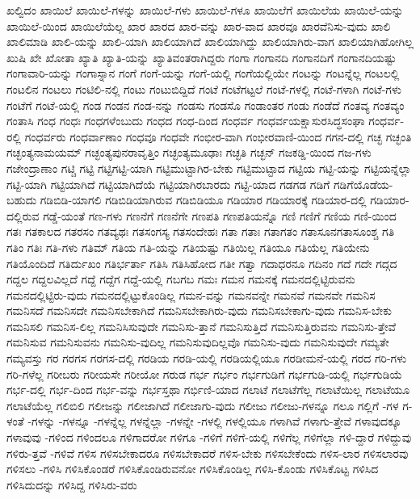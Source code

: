 {ಖಲ್ವಿದಂ
ಖಾಯಿಲೆ
ಖಾಯಿಲೆ-ಗಳನ್ನು
ಖಾಯಿಲೆ-ಗಳು
ಖಾಯಿಲೆ-ಗಳೂ
ಖಾಯಿಲೆಗೆ
ಖಾಯಿಲೆಯ
ಖಾಯಿಲೆ-ಯನ್ನು
ಖಾಯಿಲೆ-ಯಿಂದ
ಖಾಯಿಲೆಯೆಲ್ಲ
ಖಾರ
ಖಾರದ
ಖಾರ-ವನ್ನು
ಖಾರ-ವಾದ
ಖಾರವೂ
ಖಾರವೆನಿಸು-ವುದು
ಖಾಲಿ
ಖಾಲಿಮಾಡಿ
ಖಾಲಿ-ಯನ್ನು
ಖಾಲಿ-ಯಾಗಿ
ಖಾಲಿಯಾಗಿದೆ
ಖಾಲಿಯಾಗಿದ್ದು
ಖಾಲಿಯಾಗಿರು-ವಾಗ
ಖಾಲಿಯಾಗಿಹೋಗಿಲ್ಲ
ಖುಷಿ
ಖೇ
ಖೋತಾ
ಖ್ಯಾತಿ
ಖ್ಯಾತಿ-ಯನ್ನು
ಖ್ಯಾತಿವಂತರಾಗಿದ್ದರು
ಗಂಗಾ
ಗಂಗಾನದಿ
ಗಂಗಾನದಿಗೆ
ಗಂಗಾನದಿಯಷ್ಟು
ಗಂಗಾವಾರಿ-ಯನ್ನು
ಗಂಗಾಸ್ನಾನ
ಗಂಗೆ
ಗಂಗೆ-ಯನ್ನು
ಗಂಗೆ-ಯಲ್ಲಿ
ಗಂಗೆಯಲ್ಲಿಯೇ
ಗಂಟನ್ನು
ಗಂಟನ್ನೆಲ್ಲ
ಗಂಟಲಲ್ಲಿ
ಗಂಟಲಿನ
ಗಂಟಲು
ಗಂಟಿಲಿ-ನಲ್ಲಿ
ಗಂಟು
ಗಂಟುಬಿದ್ದಿದೆ
ಗಂಟೆ
ಗಂಟೆಗಟ್ಟಲೆ
ಗಂಟೆ-ಗಳಲ್ಲಿ
ಗಂಟೆ-ಗಳಾಗಿ
ಗಂಟೆ-ಗಳು
ಗಂಟೆಗೆ
ಗಂಟೆ-ಯಲ್ಲಿ
ಗಂಡ
ಗಂಡನ
ಗಂಡ-ನನ್ನು
ಗಂಡಸು
ಗಂಡಸೊ
ಗಂಡಾಂತರ
ಗಂಡು
ಗಂಡೆದೆ
ಗಂತವ್ಯ
ಗಂತವ್ಯಂ
ಗಂತಾಸಿ
ಗಂಧ
ಗಂಧಃ
ಗಂಧಗಳೆಂಬುದು
ಗಂಧದ
ಗಂಧ-ದಿಂದ
ಗಂಧರ್ವ
ಗಂಧರ್ವಯಕ್ಷಾಸುರಸಿದ್ಧಸಂಘಾ
ಗಂಧರ್ವ-ರಲ್ಲಿ
ಗಂಧರ್ವರು
ಗಂಧರ್ವಾಣಾಂ
ಗಂಧವೂ
ಗಂಧವೇ
ಗಂಭೀರ-ವಾಗಿ
ಗಂಭೀರವಾಣಿ-ಯಿಂದ
ಗಗನ-ದಲ್ಲಿ
ಗಚ್ಛ
ಗಚ್ಛಂತಿ
ಗಚ್ಛಂತ್ಯನಾಮಯಮ್
ಗಚ್ಛಂತ್ಯಪುನರಾವೃತ್ತಿಂ
ಗಚ್ಛಂತ್ಯಮೂಢಾಃ
ಗಚ್ಛತಿ
ಗಚ್ಛನ್
ಗಜಕಡ್ಡಿ-ಯಿಂದ
ಗಜ-ಗಳು
ಗಜೇಂದ್ರಾಣಾಂ
ಗಟ್ಚಿ
ಗಟ್ಟಿ
ಗಟ್ಟಿಗಟ್ಟಿ-ಯಾಗಿ
ಗಟ್ಟಿಮುಟ್ಟಾಗಿರ-ಬೇಕು
ಗಟ್ಟಿಮುಟ್ಟಾದ
ಗಟ್ಟಿಯ
ಗಟ್ಟಿ-ಯನ್ನು
ಗಟ್ಟಿಯನ್ನೆಲ್ಲಾ
ಗಟ್ಟಿ-ಯಾಗಿ
ಗಟ್ಟಿಯಾಗಿದೆ
ಗಟ್ಟಿಯಾಗಿದೆಯೆ
ಗಟ್ಟಿಯಾಗಿರಬಾರದು
ಗಟ್ಟಿ-ಯಾದ
ಗಡಗಡ
ಗಡಿಗೆ
ಗಡಿಗೆಯೊಡೆಯ-ಬಹುದು
ಗಡಿಬಿಡಿ-ಯಾಗಲಿ
ಗಡಿಬಿಡಿಯಾಗಿರುವ
ಗಡಿಬಿಡಿಯೂ
ಗಡಿಯಾರ
ಗಡಿಯಾರಕ್ಕೆ
ಗಡಿಯಾರ-ದಲ್ಲಿ
ಗಡಿಯಾರ-ದಲ್ಲಿರುವ
ಗಡ್ಡೆ-ಯಂತೆ
ಗಣ-ಗಳು
ಗಣನೆಗೆ
ಗಣನೆಗೇ
ಗಣಪತಿ
ಗಣಪತಿಯನ್ನೊ
ಗಣಿ
ಗಣಿಗೆ
ಗಣಿಯ
ಗಣಿ-ಯಿಂದ
ಗತಃ
ಗತಕಾಲದ
ಗತರಸಂ
ಗತವ್ಯಥಃ
ಗತಸಂಗಸ್ಯ
ಗತಸಂದೇಹಃ
ಗತಾ
ಗತಾಃ
ಗತಾಗತಂ
ಗತಾಸೂನಗತಾಸೂಂಶ್ಚ
ಗತಿ
ಗತಿಂ
ಗತಿಃ
ಗತಿ-ಗಳು
ಗತಿಮ್
ಗತಿಯ
ಗತಿ-ಯನ್ನು
ಗತಿಯಷ್ಟು
ಗತಿಯಿಲ್ಲ
ಗತಿಯೂ
ಗತಿಯೆಲ್ಲ
ಗತಿಯೇನು
ಗತಿಯೊಂದಿದೆ
ಗತಿರ್ದುಖಂ
ಗತಿರ್ಭರ್ತಾ
ಗತಿಸಿ
ಗತಿಸಿಹೋದ
ಗತೀ
ಗತ್ವಾ
ಗದಾಧರನೂ
ಗದಿನಂ
ಗದೆ
ಗದೇ
ಗದ್ಗದ
ಗದ್ದಲ
ಗದ್ದಲವಿಲ್ಲದೆ
ಗದ್ದೆ
ಗದ್ದೆಗ
ಗದ್ದೆ-ಯಲ್ಲಿ
ಗಬಗಬ
ಗಮಃ
ಗಮನ
ಗಮನಕ್ಕೆ
ಗಮನದಲ್ಲಿಟ್ಟಿರುವನು
ಗಮನದಲ್ಲಿಟ್ಟಿರು-ವುದು
ಗಮನದಲ್ಲಿಟ್ಟುಕೊಂಡಿಲ್ಲ
ಗಮನ-ವನ್ನು
ಗಮನವನ್ನೇ
ಗಮನವೆ
ಗಮನವೇ
ಗಮನಿಸ
ಗಮನಿಸದೆ
ಗಮನಿಸದೇ
ಗಮನಿಸಬೇಕಾಗಿದೆ
ಗಮನಿಸಬೇಕಾಗಿರು-ವುದು
ಗಮನಿಸಬೇಕಾಗು-ವುದು
ಗಮನಿಸ-ಬೇಕು
ಗಮನಿಸಲಿ
ಗಮನಿಸ-ಲಿಲ್ಲ
ಗಮನಿಸಿಸುವುದೇ
ಗಮನಿಸು-ತ್ತಾನೆ
ಗಮನಿಸುತ್ತಿದೆ
ಗಮನಿಸುತ್ತಿರುವನು
ಗಮನಿಸು-ತ್ತೇವೆ
ಗಮನಿಸುವ
ಗಮನಿಸುವನು
ಗಮನಿಸು-ವುದಿಲ್ಲ
ಗಮನಿಸುವುದಿಲ್ಲವೊ
ಗಮನಿಸು-ವುದು
ಗಮನಿಸುವುದೇ
ಗಮ್ಯತೇ
ಗಮ್ಯವಸ್ತು
ಗರ
ಗರಗಸ
ಗರಗಸ-ದಲ್ಲಿ
ಗರಡಿಯ
ಗರಡಿ-ಯಲ್ಲಿ
ಗರಡಿಯಲ್ಲಿಯೂ
ಗರಡೀಮನೆ-ಯಲ್ಲಿ
ಗರದ
ಗರಿ-ಗಳು
ಗರಿ-ಗಳೆಲ್ಲ
ಗರೀಬರು
ಗರೀಯಸೇ
ಗರೀಯೋ
ಗರುಡ
ಗರ್ಭ
ಗರ್ಭಂ
ಗರ್ಭಗುಡಿಗೆ
ಗರ್ಭಗುಡಿ-ಯಲ್ಲಿ
ಗರ್ಭಗುಡಿಯೆ
ಗರ್ಭ-ದಲ್ಲಿ
ಗರ್ಭ-ದಿಂದ
ಗರ್ಭ-ವನ್ನು
ಗರ್ಭಸ್ತಥಾ
ಗರ್ಭಿಣಿ-ಯಾದ
ಗಲಾಟೆ
ಗಲಾಟೆಗೆಲ್ಲ
ಗಲಾಟೆಯಿಲ್ಲ
ಗಲಾಟೆಯೂ
ಗಲಾಟೆಯೆಲ್ಲ
ಗಲಿಬಿಲಿ
ಗಲೀಜನ್ನು
ಗಲೀಜಾಗಿದೆ
ಗಲೀಜಾಗು-ವುದು
ಗಲೀಜು
ಗಲೀಜು-ಗಳನ್ನೂ
ಗಲೂ
ಗಲ್ಲಿಗೆ
-ಗಳ
ಗ-ಳಂತೆ
-ಗಳನ್ನು
-ಗಳನ್ನೂ
-ಗಳನ್ನೆಲ್ಲ
ಗಳನ್ನೆಲ್ಲಾ
-ಗಳನ್ನೇ
-ಗಳಲ್ಲಿ
ಗಳಲ್ಲಿಯೂ
ಗಳಾಗಿವೆ
ಗಳಾಗು-ತ್ತೇವೆ
ಗಳಾವುದಕ್ಕೂ
ಗಳಾವುವು
-ಗಳಿಂದ
ಗಳಿಂದಲೂ
ಗಳಿಗಾದರೋ
ಗಳಿಗೂ
-ಗಳಿಗೆ
ಗಳಿಗೆ-ಯಲ್ಲಿ
ಗಳಿಗೆಲ್ಲ
ಗಳಿಗೆಲ್ಲಾ
ಗಳಿ-ದ್ದಾರೆ
ಗಳಿದ್ದುವು
ಗಳಿರು-ತ್ತವೆ
-ಗಳಿವೆ
ಗಳಿಸ
ಗಳಿಸಬೇಕಾದರೂ
ಗಳಿಸಬೇಕಾದರೆ
ಗಳಿಸ-ಬೇಕು
ಗಳಿಸಬೇಕೆಂದು
ಗಳಿಸ-ಲಾರ
ಗಳಿಸಲಾರವು
ಗಳಿಸಲು
-ಗಳಿಸಿ
ಗಳಿಸಿಕೊಂಡರೆ
ಗಳಿಸಿಕೊಂಡಿರುವನೋ
ಗಳಿಸಿಕೊಂಡಿಲ್ಲ
ಗಳಿಸಿ-ಕೊಂಡು
ಗಳಿಸಿಕೊಟ್ಟ
ಗಳಿಸಿದ
ಗಳಿಸಿದುದನ್ನು
ಗಳಿಸಿದ್ದ
ಗಳಿಸಿರು-ವರು
}
